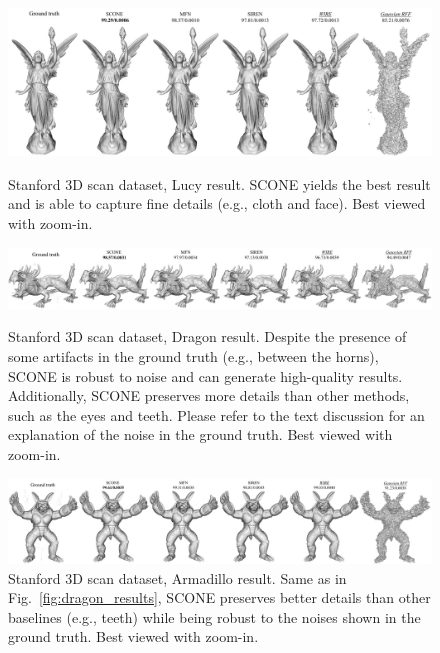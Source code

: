 \documentclass[letterpaper]{article} %
\begin{document}
\begin{figure}[ht]
    \centering
    \includegraphics[width=1\columnwidth]{Figures/lucy_results.jpg}
    \caption{Stanford 3D scan dataset, Lucy result. SCONE yields the best result and is able to capture fine details (e.g., cloth and face). Best viewed with zoom-in.}
    \label{fig:lucy_results}

    \centering
    \includegraphics[width=1\columnwidth]{Figures/dragon_results.jpg}
    \caption{Stanford 3D scan dataset, Dragon result. Despite the presence of some artifacts in the ground truth (e.g., between the horns), SCONE is robust to noise and can generate high-quality results. Additionally, SCONE preserves more details than other methods, such as the eyes and teeth. Please refer to the text discussion for an explanation of the noise in the ground truth. Best viewed with zoom-in.}
    \label{fig:dragon_results}

    \centering
    \includegraphics[width=1\columnwidth]{Figures/armadillo_results.jpg}
    \caption{Stanford 3D scan dataset, Armadillo result. Same as in Fig.~\ref{fig:dragon_results}, SCONE preserves better details than other baselines (e.g., teeth) while being robust to the noises shown in the ground truth. Best viewed with zoom-in.}
    \label{fig:armadillo_results}
\end{figure}
\end{document}
